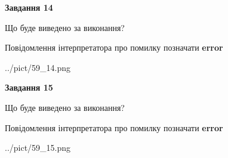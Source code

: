 \documentclass[11pt, ukrainian]{article}
\begin{document}
{\begin {large}
{\begin {center}\textbf{Завдання 14}\end {center}}\par
Що буде виведено за виконання? \par
Повідомлення інтерпретатора про помилку позначати \textbf{error}

\begin{center}
	{../pict/59_14.png}
\end{center}
\newpage

{\begin {center}\textbf{Завдання 15}\end {center}}\par
Що буде виведено за виконання? \par
Повідомлення інтерпретатора про помилку позначати \textbf{error}

\begin{center}
	{../pict/59_15.png}
\end{center}
\newpage

\end {large}}
\end{document}
